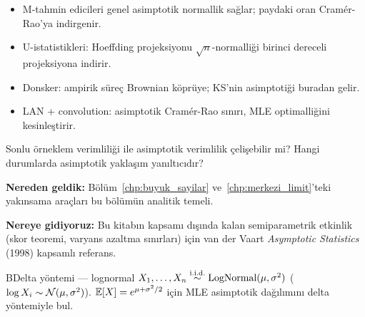 
\begin{mikroozet}
\begin{itemize}
  \item M-tahmin edicileri genel asimptotik normallik sağlar; paydaki oran Cramér-Rao'ya indirgenir.
  \item U-istatistikleri: Hoeffding projeksiyonu $\sqrt{n}$-normalliği birinci dereceli projeksiyona indirir.
  \item Donsker: ampirik süreç Brownian köprüye; KS'nin asimptotiği buradan gelir.
  \item LAN + convolution: asimptotik Cramér-Rao sınırı, MLE optimalliğini kesinleştirir.
\end{itemize}
\end{mikroozet}

\begin{ozyansima}
Sonlu örneklem verimliliği ile asimptotik verimlilik çelişebilir mi? Hangi durumlarda asimptotik yaklaşım yanıltıcıdır?
\end{ozyansima}

\begin{kopru}
\textbf{Nereden geldik:} Bölüm~\ref{chp:buyuk_sayilar} ve~\ref{chp:merkezi_limit}'teki yakınsama araçları bu bölümün analitik temeli.

\textbf{Nereye gidiyoruz:} Bu kitabın kapsamı dışında kalan semiparametrik etkinlik (skor teoremi, varyans azaltma sınırları) için van der Vaart \emph{Asymptotic Statistics} (1998) kapsamlı referans.
\end{kopru}


\cozumlualistirmalar

\begin{alistirma}[Al.18.1]{B}{Delta yöntemi --- lognormal}
$X_1,\ldots,X_n\overset{\text{i.i.d.}}{\sim}\mathrm{LogNormal}(\mu,\sigma^2)$ ($\log X_i\sim\mathcal{N}(\mu,\sigma^2)$). $\mathbb{E}[X]=e^{\mu+\sigma^2/2}$ için MLE asimptotik dağılımını delta yöntemiyle bul.
\end{alistirma}

